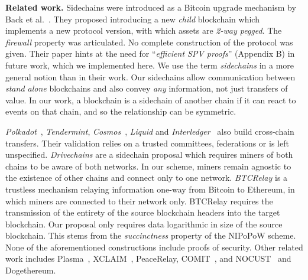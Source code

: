 \noindent\textbf{Related work. }
Sidechains were introduced as a Bitcoin upgrade mechanism by Back et
al.~\cite{sidechains}. They proposed introducing a new \emph{child} blockchain
which implements a new protocol version, with which assets are \emph{2-way
pegged}. The \emph{firewall} property was articulated. No complete construction
of the protocol was given. Their paper hints at the need for ``\emph{efficient
SPV proofs}'' (Appendix B) in future work, which we implemented here. We use the
term \emph{sidechains} in a more general notion than in their work. Our
sidechains allow communication between \emph{stand alone} blockchains and also
convey \emph{any} information, not just transfers of value. In our work, a
blockchain is a sidechain of another chain if it can react to events on that
chain, and so the relationship can be symmetric.

\emph{Polkadot}~\cite{wood2016polkadot}, \emph{Tendermint},
\emph{Cosmos}~\cite{buchman2016tendermint}, \emph{Liquid} and
\emph{Interledger}~\cite{interledger} also build cross-chain transfers. Their
validation relies on a trusted committees, federations or is left unspecified.
\emph{Drivechains} are a sidechain proposal which requires miners of both chains
to be aware of both networks. In our scheme, miners remain agnostic to the
existence of other chains and connect only to one network. \emph{BTCRelay} is a
trustless mechanism relaying information one-way from Bitcoin to Ethereum, in
which miners are connected to their network only. BTCRelay requires the
transmission of the entirety of the source blockchain headers into the target
blockchain. Our proposal only requires data logarithmic in size of the source
blockchain. This stems from the \emph{succinctness} property of the NIPoPoW
scheme.
\ifshort\else
None of the aforementioned constructions include
proofs of security.
\fi
Other related work includes Plasma~\cite{poon2017plasma},
XCLAIM~\cite{zamyatinxclaim}, PeaceRelay, COMIT~\cite{comit}, and
NOCUST~\cite{khalil2018nocust} and Dogethereum.
